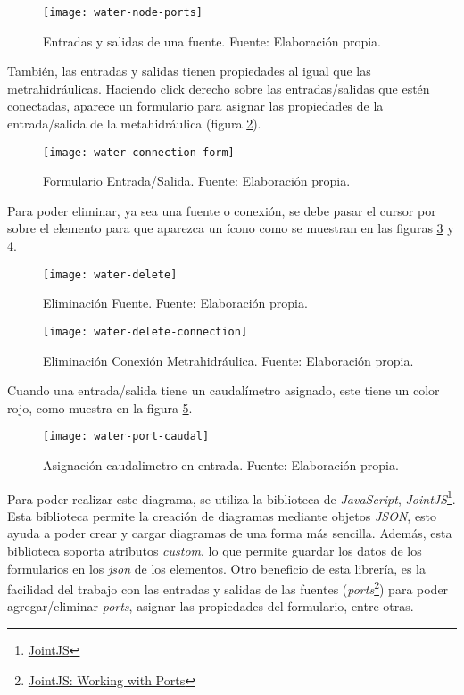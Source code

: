 \begin{figure}[H]
	\centering
	\texttt{[image: water-node-ports]}
	\caption{\label{fig:water-node-ports} Entradas y salidas de una fuente. Fuente: Elaboración propia.}
\end{figure}

También, las entradas y salidas tienen propiedades al igual que las metrahidráulicas. Haciendo click derecho sobre las entradas/salidas que estén conectadas, aparece un formulario para asignar las propiedades de la entrada/salida de la metahidráulica (figura \ref{fig:water-conexion-form}).

\begin{figure}[H]
	\centering
	\texttt{[image: water-connection-form]}
	\caption{\label{fig:water-conexion-form} Formulario Entrada/Salida. Fuente: Elaboración propia.}
\end{figure}

Para poder eliminar, ya sea una fuente o conexión, se debe pasar el cursor por sobre el elemento para que aparezca un ícono como se muestran en las figuras \ref{fig:water-delete} y \ref{fig:water-delete-connection}.

\begin{figure}[H]
	\centering
	\texttt{[image: water-delete]}
	\caption{\label{fig:water-delete} Eliminación Fuente. Fuente: Elaboración propia.}
\end{figure}

\begin{figure}[H]
	\centering
	\texttt{[image: water-delete-connection]}
	\caption{\label{fig:water-delete-connection} Eliminación Conexión Metrahidráulica. Fuente: Elaboración propia.}
\end{figure}

Cuando una entrada/salida tiene un caudalímetro asignado, este tiene un color rojo, como muestra en la figura \ref{fig:water-port-caudal}.

\begin{figure}[H]
	\centering
	\texttt{[image: water-port-caudal]}
	\caption{\label{fig:water-port-caudal} Asignación caudalimetro en entrada. Fuente: Elaboración propia.}
\end{figure}

Para poder realizar este diagrama, se utiliza la biblioteca de \textit{JavaScript}, \textit{JointJS}\footnote{\href{https://www.jointjs.com/}{JointJS}}. 
Esta biblioteca permite la creación de diagramas mediante objetos \textit{JSON}, esto ayuda a poder crear y cargar diagramas de una forma más sencilla. Además, esta biblioteca soporta atributos \textit{custom}, lo que permite guardar los datos de los formularios en los \textit{json} de los elementos.
Otro beneficio de esta librería, es la facilidad del trabajo con las entradas y salidas de las fuentes (\textit{ports}\footnote{\href{https://resources.jointjs.com/tutorial/ports}{JointJS: Working with Ports}}) para poder agregar/eliminar \textit{ports}, asignar las propiedades del formulario, entre otras.

